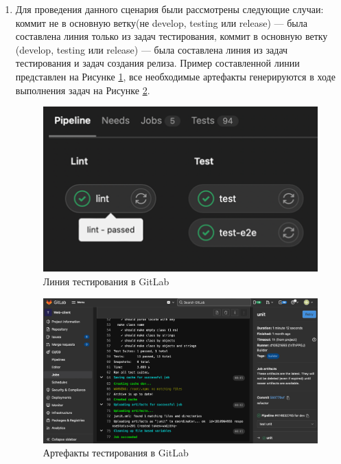 \begin{enumerate}
    \item Для проведения данного сценария были рассмотрены следующие случаи:
    коммит не в основную ветку(не develop, testing или release) --- была составлена линия только из задач тестирования,
    коммит в основную ветку (develop, testing или release) --- была составлена линия из задач тестирования и задач создания релиза.
    Пример составленной линии представлен на Рисунке \ref{fig:qa-pipeline}, все необходимые артефакты генерируются в ходе выполнения задач на Рисунке \ref{fig:qa-artifacts}.

    \begin{figure}[ht]
        \centering
        \includegraphics[scale=0.8]{src/figures/qa-pipeline}
        \caption{Линия тестирования в GitLab}
        \label{fig:qa-pipeline}
    \end{figure}

    \begin{figure}[ht]
        \centering
        \includegraphics[scale=0.4]{src/figures/qa-artifacts}
        \caption{Артефакты тестирования в GitLab}
        \label{fig:qa-artifacts}
    \end{figure}


\end{enumerate}

